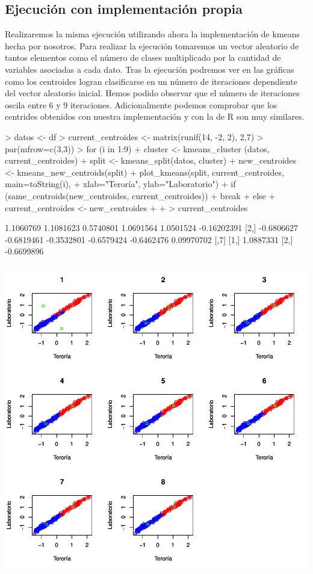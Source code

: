 \documentclass [a4paper] {article}
\begin{document}
\subsection{Ejecución con implementación propia}
Realizaremos la misma ejecución utilizando ahora la implementación de kmeans hecha por nosotros.
Para realizar la ejecución tomaremos un vector aleatorio de tantos elementos como el número de clases multiplicado por la cantidad de variables asociadas a cada dato.
Tras la ejecución podremos ver en las gráficas como los centroides logran clasificarse en un número de iteraciones dependiente del vector aleatorio inicial.
Hemos podido observar que el número de iteraciones oscila entre 6 y 9 iteraciones.
Adicionalmente podemos comprobar que los centrides obtenidos con nuestra implementación y con la de R son muy similares.
\begin{center}
\begin{Schunk}
\begin{Sinput}
> datos <- df
> current_centroides <- matrix(runif(14, -2, 2), 2,7)
> par(mfrow=c(3,3))
> for (i in 1:9){
+   cluster <- kmeans_cluster (datos, current_centroides)
+   split <- kmeans_split(datos, cluster)
+   new_centroides <- kmeans_new_centroids(split)
+   plot_kmeans(split, current_centroides, main=toString(i),
+               xlab="Teroría", ylab="Laboratorio")
+   if (same_centroids(new_centroides, current_centroides)){
+     break
+   }else{
+     current_centroides <- new_centroides
+   }
+ }
> current_centroides
\end{Sinput}
\begin{Soutput}
           [,1]       [,2]       [,3]       [,4]       [,5]        [,6]
[1,]  1.1060769  1.1081623  0.5740801  1.0691564  1.0501524 -0.16202391
[2,] -0.6806627 -0.6819461 -0.3532801 -0.6579424 -0.6462476  0.09970702
           [,7]
[1,]  1.0887331
[2,] -0.6699896
\end{Soutput}
\end{Schunk}
\includegraphics{entrega-kmeans_our_implementation}
\end{center}
\end{document}
